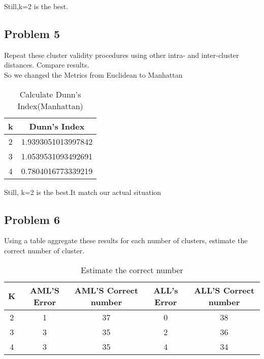 \documentclass[a4pper,11pt,onecolumn]{article}
\begin{document}
Still,k=2 is the best.

\subsection{Problem 5}

Repeat these cluster validity procedures using other intra- and inter-cluster distances. Compare results.\\

So we changed the Metrics from Euclidean to Manhattan

\begin{table}[h]  %
	\centering  %
	\caption{Calculate Dunn's Index(Manhattan)}  %
	\begin{tabular}{cc}  %
		\hline
		\hline
		k & Dunn's Index \\ [0.5ex] 
		\hline
		2 & 1.9393051013997842   \\
		3 & 1.0539531093492691 \\
		4 & 0.7804016773339219  \\
		\hline
		\hline
	\end{tabular}
\end{table}

Still, k=2 is the best.It match our actual situation

\subsection{Problem 6}

Using a table aggregate these results for each number of clusters, estimate the  correct number of cluster.\\

\begin{table}[h]  %
	\centering  %
	\caption{Estimate the correct number}  %
	\begin{tabular}{ccccc}  %
		\hline
		\hline
		K& AML'S Error & AML'S Correct number& ALL's Error & ALL'S Correct number \\ [0.5ex] 
		\hline
		2& 1 &37& 0&  38  \\
		3& 3 &35& 2 & 36\\
		4& 3 & 35&4  &34\\
	
		\hline
		\hline
	\end{tabular}
\end{table}
\end{document}
